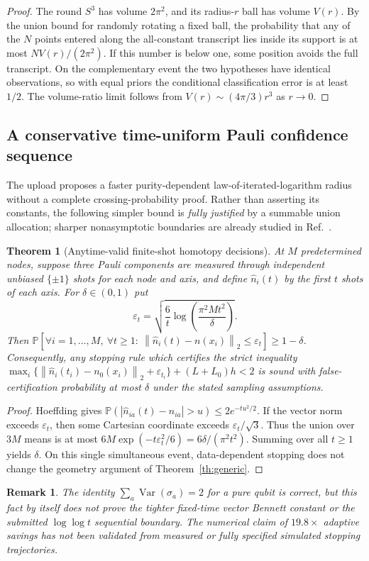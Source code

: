 \documentclass[aps,prd,onecolumn,notitlepage,11pt,superscriptaddress,longbibliography]{revtex4-2}
\newtheorem{theorem}{Theorem}
\newtheorem{remark}{Remark}
\newcommand{\Prob}{\mathbb P}
\newcommand{\norm}[1]{\left\lVert#1\right\rVert}
\begin{document}
\begin{proof}
The round $S^3$ has volume $2\pi^2$, and its radius-$r$ ball has volume $V(r)$. By the union bound for randomly rotating a fixed ball, the probability that any of the $N$ points entered along the all-constant transcript lies inside its support is at most $NV(r)/(2\pi^2)$. If this number is below one, some position avoids the full transcript. On the complementary event the two hypotheses have identical observations, so with equal priors the conditional classification error is at least $1/2$. The volume-ratio limit follows from $V(r)\sim(4\pi/3)r^3$ as $r\to0$.
\end{proof}
\subsection{A conservative time-uniform Pauli confidence sequence}
The upload proposes a faster purity-dependent law-of-iterated-logarithm radius without a complete crossing-probability proof. Rather than asserting its constants, the following simpler bound is \emph{fully justified} by a summable union allocation; sharper nonasymptotic boundaries are already studied in Ref.~\cite{Howard2021}.
\begin{theorem}[Anytime-valid finite-shot homotopy decisions]\label{th:v7anytime}
At $M$ predetermined nodes, suppose three Pauli components are measured through independent unbiased $\{\pm1\}$ shots for each node and axis, and define $\widehat n_i(t)$ by the first $t$ shots of each axis. For $\delta\in(0,1)$ put
\begin{equation}\boxed{\varepsilon_t=\sqrt{\frac{6}{t}\log\left(\frac{\pi^2Mt^2}{\delta}\right)}.}\end{equation}
Then $\Prob[\forall i=1,\ldots,M,\ \forall t\ge1:\ \norm{\widehat n_i(t)-n(x_i)}_2\le\varepsilon_t]\ge1-\delta$. Consequently, any stopping rule which certifies the strict inequality $\max_i\{\norm{\widehat n_i(t_i)-n_0(x_i)}_2+\varepsilon_{t_i}\}+(L+L_0)h<2$ is sound with false-certification probability at most $\delta$ under the stated sampling assumptions.
\end{theorem}
\begin{proof}
Hoeffding gives $\Prob(|\widehat n_{ia}(t)-n_{ia}|>u)\le2e^{-tu^2/2}$. If the vector norm exceeds $\varepsilon_t$, then some Cartesian coordinate exceeds $\varepsilon_t/\sqrt3$. Thus the union over $3M$ means is at most $6M\exp(-t\varepsilon_t^2/6)=6\delta/(\pi^2t^2)$. Summing over all $t\ge1$ yields $\delta$. On this single simultaneous event, data-dependent stopping does not change the geometry argument of Theorem~\ref{th:generic}.
\end{proof}
\begin{remark}
The identity $\sum_a\operatorname{Var}(\sigma_a)=2$ for a pure qubit is correct, but this fact by itself does \emph{not} prove the tighter fixed-time vector Bennett constant or the submitted $\log\log t$ sequential boundary. The numerical claim of $19.8\times$ adaptive savings has not been validated from measured or fully specified simulated stopping trajectories.
\end{remark}
\end{document}
